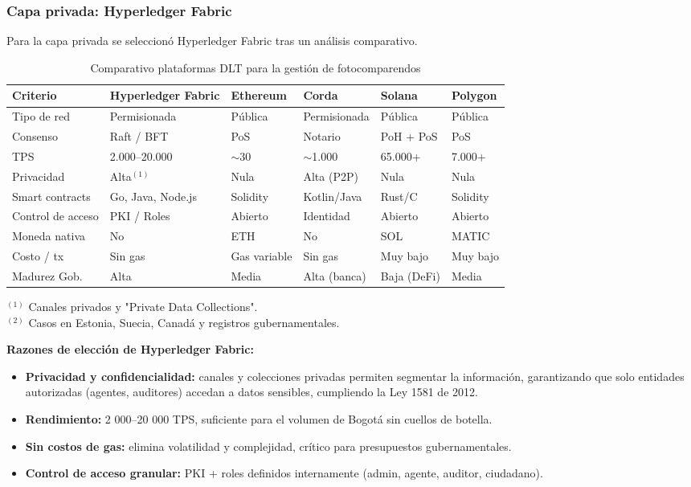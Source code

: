 \subsubsection{Capa privada: Hyperledger Fabric}

Para la capa privada se seleccionó Hyperledger Fabric tras un análisis comparativo.

\begin{table}[H]
\centering
\small
\caption{Comparativo plataformas DLT para la gestión de fotocomparendos}
\begin{tabular}{p{2.4cm}p{2.2cm}p{2cm}p{2cm}p{2cm}p{2cm}}
\toprule
\textbf{Criterio} & \textbf{Hyperledger Fabric} & \textbf{Ethereum} & \textbf{Corda} & \textbf{Solana} & \textbf{Polygon} \\
\midrule
Tipo de red & Permisionada & Pública & Permisionada & Pública & Pública \\
Consenso & Raft / BFT & PoS & Notario & PoH + PoS & PoS \\
TPS & 2.000–20.000 & $\sim$30 & $\sim$1.000 & 65.000+ & 7.000+ \\
Privacidad & Alta$^{(1)}$ & Nula & Alta (P2P) & Nula & Nula \\
Smart contracts & Go, Java, Node.js & Solidity & Kotlin/Java & Rust/C & Solidity \\
Control de acceso & PKI / Roles & Abierto & Identidad & Abierto & Abierto \\
Moneda nativa & No & ETH & No & SOL & MATIC \\
Costo / tx & Sin gas & Gas variable & Sin gas & Muy bajo & Muy bajo \\
Madurez Gob. & Alta & Media & Alta (banca) & Baja (DeFi) & Media \\
\bottomrule
\end{tabular}
\vspace{2pt}
\footnotesize
$^{(1)}$ Canales privados y "Private Data Collections".\\
$^{(2)}$ Casos en Estonia, Suecia, Canadá y registros gubernamentales.
\label{tab:dlt_smart}
\end{table}

\textbf{Razones de elección de Hyperledger Fabric:}

\begin{itemize}
    \item \textbf{Privacidad y confidencialidad:} canales y colecciones privadas permiten segmentar la información, garantizando que solo entidades autorizadas (agentes, auditores) accedan a datos sensibles, cumpliendo la Ley 1581 de 2012.
    
    \item \textbf{Rendimiento:} 2 000–20 000 TPS, suficiente para el volumen de Bogotá sin cuellos de botella.
    
    \item \textbf{Sin costos de gas:} elimina volatilidad y complejidad, crítico para presupuestos gubernamentales.
    
    \item \textbf{Control de acceso granular:} PKI + roles definidos internamente (admin, agente, auditor, ciudadano).
\end{itemize}

